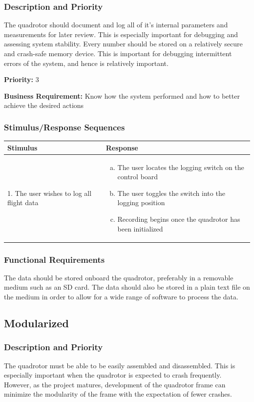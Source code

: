 \documentclass[english]{article}
\numberwithin{equation}{section} %
\begin{document}
\subsubsection{Description and Priority}
The quadrotor should document and log all of it's internal parameters and measurements for later review. This is especially important for debugging and assessing system stability. Every number should be stored on a relatively secure and crash-safe memory device. This is important for debugging intermittent errors of the system, and hence is relatively important.

\textbf{Priority:} 3

\textbf{Business Requirement:} Know how the system performed and how to better achieve the desired actions

\subsubsection{Stimulus/Response Sequences}

\begin{longtable}{p{3cm} | p{8.5cm}}
\hline
\textbf{Stimulus} & \textbf{Response}\\
\hline
1. The user wishes to log all flight data &
\begin{enumerate}[(a)]\itemsep1pt %
\item The user locates the logging switch on the control board
\item The user toggles the switch into the logging position
\item Recording begins once the quadrotor has been initialized
\end{enumerate}
\\ 
\hline
\end{longtable}
\subsubsection{Functional Requirements}
The data should be stored onboard the quadrotor, preferably in a removable medium such as an SD card. The data should also be stored in a plain text file on the medium in order to allow for a wide range of software to process the data.
\bigskip

\subsection{Modularized} 
\subsubsection{Description and Priority}
The quadrotor must be able to be easily assembled and disassembled. This is especially important when the quadrotor is expected to crash frequently. However, as the project matures, development of the quadrotor frame can minimize the modularity of the frame with the expectation of fewer crashes.
\end{document}
